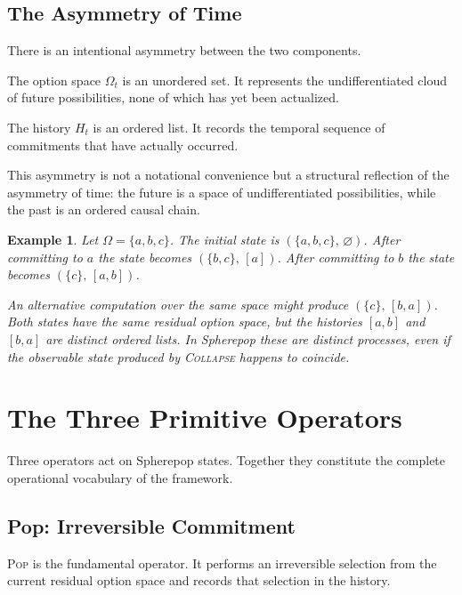 \documentclass[12pt]{article}
\newtheorem{example}{Example}[section]
\begin{document}
\subsection{The Asymmetry of Time}

There is an intentional asymmetry between the two components.

The option space $\Omega_t$ is an unordered set. It represents the undifferentiated cloud of future possibilities, none of which has yet been actualized.

The history $H_t$ is an ordered list. It records the temporal sequence of commitments that have actually occurred.

This asymmetry is not a notational convenience but a structural reflection of the asymmetry of time: the future is a space of undifferentiated possibilities, while the past is an ordered causal chain.

\begin{example}
Let $\Omega = \{a, b, c\}$. The initial state is $(\{a,b,c\},\, \varnothing)$. After committing to $a$ the state becomes $(\{b,c\},\, [a])$. After committing to $b$ the state becomes $(\{c\},\, [a,b])$.

An alternative computation over the same space might produce $(\{c\},\, [b,a])$. Both states have the same residual option space, but the histories $[a,b]$ and $[b,a]$ are distinct ordered lists. In Spherepop these are distinct processes, even if the observable state produced by \textsc{Collapse} happens to coincide.
\end{example}

\section{The Three Primitive Operators}
\label{sec:operators}

Three operators act on Spherepop states. Together they constitute the complete operational vocabulary of the framework.

\subsection{Pop: Irreversible Commitment}

\textsc{Pop} is the fundamental operator. It performs an irreversible selection from the current residual option space and records that selection in the history.
\end{document}
